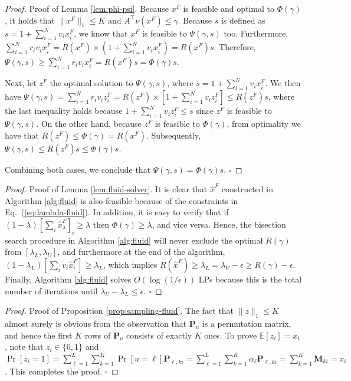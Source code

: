 \documentclass[opre]{informs3aa}
\newcommand{\mat}{\mathbf }
\renewcommand{\hat}{\widehat}
\renewcommand{\hat}{\widehat}
\begin{document}
\begin{appendices}
\begin{proof}{Proof of Lemma \ref{lem:phi-psi}.}
Because $x^F$ is feasible and optimal to $\Phi(\gamma)$, it holds that $\|x^F\|_1\leq K$ and $A^\top\nu(x^F)\leq\gamma$.
Because $s$ is defined as $s=1+\sum_{i=1}^Nv_ix_i^F$, we know that $x^F$ is feasible to $\Psi(\gamma,s)$ too.
Furthermore, $\sum_{i=1}^Nr_iv_ix_i^F = R(x^F)\times (1+\sum_{i=1}^Nv_ix_i^F) = R(x^F)s$. Therefore, $\Psi(\gamma,s)\geq \sum_{i=1}^N r_iv_ix_i^F = R(x^F)s = \Phi(\gamma)s$.

Next, let $z^F$ the optimal solution to $\Psi(\gamma,s)$, where $s=1+\sum_{i=1}^Nv_ix_i^F$. We then have $\Psi(\gamma,s)=\sum_{i=1}^N r_iv_iz_i^F = R(z^F)\times[1+\sum_{i=1}^Nv_iz_i^F] \leq R(z^F)s$,
where the last inequality holds because $1+\sum_{i=1}^Nv_iz_i^F\leq s$ since $z^F$ is feasible to $\Psi(\gamma,s)$.
On the other hand, because $z^F$ is feasible to $\Phi(\gamma)$, from optimality we have that $R(z^F)\leq \Phi(\gamma) = R(x^F)$. Subsequently,
$\Psi(\gamma,s) \leq R(z^F)s \leq \Phi(\gamma) s$.

Combining both cases, we conclude that $\Psi(\gamma,s)=\Phi(\gamma)s$. $\square$
\end{proof}


\begin{proof}{Proof of Lemma \ref{lem:fluid-solver}.}
It is clear that $\hat x^F$ constructed in Algorithm \ref{alg:fluid} is also feasible because of the constraints in Eq.~(\ref{eq:lambda-fluid}).
In addition, it is easy to verify that if $(1-\lambda)[\sum_i\hat x^F_\lambda]_i\geq\lambda$ then $\Phi(\gamma)\geq\lambda$, and vice versa.
Hence, the bisection search procedure in Algorithm \ref{alg:fluid} will never exclude the optimal $R(\gamma)$ from $[\lambda_L,\lambda_U]$,
and furthermore at the end of the algorithm, $(1-\lambda_L)[\sum_i v_i\hat x_i^F] \geq \lambda_L$, which implies $R(\hat x^F)\geq\lambda_L = \lambda_U-\epsilon\geq R(\gamma)-\epsilon$.
Finally, Algorithm \ref{alg:fluid} solves $O(\log(1/\epsilon))$ LPs because this is the total number of iterations until $\lambda_U-\lambda_L\leq\epsilon$. $\square$
\end{proof}

\begin{proof}{Proof of Proposition \ref{prop:sampling-fluid}.}
The fact that $\|z\|_1\leq K$ almost surely is obvious from the observation that $\mat P_u$ is a permutation matrix, and hence the first $K$ rows of $\mat P_u$
consists of exactly $K$ ones.
To prove $\mathbb E[z_i]=x_i$, note that $z_i\in\{0,1\}$ and $\Pr[z_i=1] = \sum_{\ell=1}^L\sum_{k=1}^K\Pr[u=\ell]\mat P_{\ell,ki} = \sum_{\ell=1}^L\sum_{k=1}^K\alpha_\ell\mat P_{\ell,ki} = \sum_{k=1}^K\mat M_{ki} = x_i$.
This completes the proof. $\square$
\end{proof}


\end{appendices}
\end{document}
